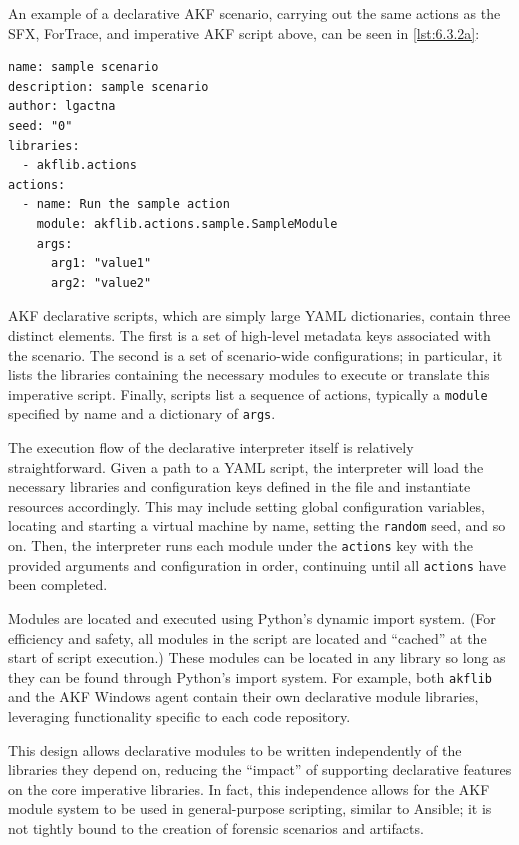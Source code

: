 \documentclass[letterpaper,12pt]{report}
\newcommand{\passthrough}[1]{#1}
\begin{document}
An example of a declarative AKF scenario, carrying out the same actions
as the SFX, ForTrace, and imperative AKF script above, can be seen in
\autoref{lst:6.3.2a}:

\begin{lstlisting}[label={lst:6.3.2a}, caption={Example of a declarative AKF scenario}, ]
name: sample scenario
description: sample scenario
author: lgactna
seed: "0"
libraries:
  - akflib.actions
actions:
  - name: Run the sample action
    module: akflib.actions.sample.SampleModule
    args:
      arg1: "value1"
      arg2: "value2"
\end{lstlisting}

AKF declarative scripts, which are simply large YAML dictionaries,
contain three distinct elements. The first is a set of high-level
metadata keys associated with the scenario. The second is a set of
scenario-wide configurations; in particular, it lists the libraries
containing the necessary modules to execute or translate this imperative
script. Finally, scripts list a sequence of actions, typically a
\passthrough{\lstinline!module!} specified by name and a dictionary of
\passthrough{\lstinline!args!}.

The execution flow of the declarative interpreter itself is relatively
straightforward. Given a path to a YAML script, the interpreter will
load the necessary libraries and configuration keys defined in the file
and instantiate resources accordingly. This may include setting global
configuration variables, locating and starting a virtual machine by
name, setting the \passthrough{\lstinline!random!} seed, and so on.
Then, the interpreter runs each module under the
\passthrough{\lstinline!actions!} key with the provided arguments and
configuration in order, continuing until all
\passthrough{\lstinline!actions!} have been completed.

Modules are located and executed using Python's dynamic import system.
(For efficiency and safety, all modules in the script are located and
``cached'' at the start of script execution.) These modules can be
located in any library so long as they can be found through Python's
import system. For example, both \passthrough{\lstinline!akflib!} and
the AKF Windows agent contain their own declarative module libraries,
leveraging functionality specific to each code repository.

This design allows declarative modules to be written independently of
the libraries they depend on, reducing the ``impact'' of supporting
declarative features on the core imperative libraries. In fact, this
independence allows for the AKF module system to be used in
general-purpose scripting, similar to Ansible; it is not tightly bound
to the creation of forensic scenarios and artifacts.
\end{document}
